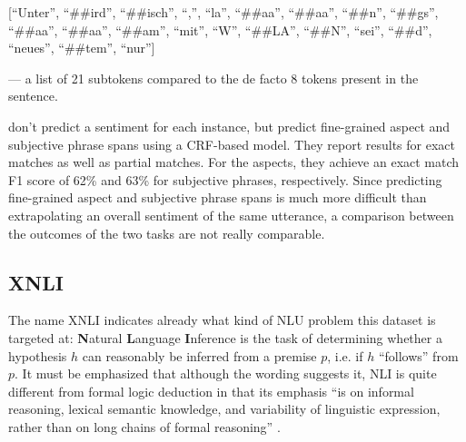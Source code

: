 [``Unter'', ``\#\#ird'', ``\#\#isch'', ``,'', ``la'', ``\#\#aa'', ``\#\#aa'', ``\#\#n'', ``\#\#gs'', ``\#\#aa'', ``\#\#aa'', ``\#\#am'', ``mit'', ``W'', ``\#\#LA'', ``\#\#N'', ``sei'', ``\#\#d'', ``neues'', ``\#\#tem'', ``nur'']

--- a list of 21 subtokens compared to the de facto 8 tokens present in the sentence.










\cite{sanger2016scare} don't predict a sentiment for each instance, but predict fine-grained
aspect and subjective phrase spans using a CRF-based model.
They report results for exact matches as well as partial matches.
For the aspects, they achieve an exact match F1 score of 62\% and 63\% for subjective phrases, respectively.
Since predicting fine-grained aspect and subjective phrase spans is much more difficult than
extrapolating an overall sentiment of the same utterance, a comparison between the outcomes of the
two tasks are not really comparable.


\subsection{XNLI}

The name XNLI indicates already what kind of NLU problem this dataset is targeted at:
\textbf{N}atural \textbf{L}anguage \textbf{I}nference is the task of determining whether
a hypothesis $h$ can reasonably be inferred from a premise $p$, i.e. if $h$ ``follows''
from $p$. It must be emphasized that although the wording suggests it, NLI is quite
different from formal logic deduction in that its emphasis ``is on informal reasoning,
lexical semantic knowledge, and variability of linguistic expression, rather than on
long chains of formal reasoning'' \citep{maccartney2009natural}.

